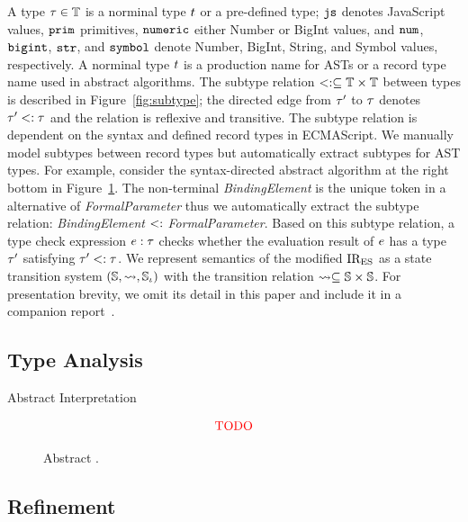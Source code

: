 A type $\tau \in \mathbb{T}$ is a norminal type $t$ or a pre-defined type;
$\texttt{js}$ denotes JavaScript values, $\texttt{prim}$ primitives, $\texttt{numeric}$ either Number
or BigInt values, and $\texttt{num}$, $\texttt{bigint}$, $\texttt{str}$, and $\texttt{symbol}$ denote Number,
BigInt, String, and Symbol values, respectively.  A norminal type $t$ is a
production name for ASTs or a record type name used in abstract algorithms.  The
subtype relation $<: \subseteq \mathbb{T} \times \mathbb{T}$ between types is
described in Figure~\ref{fig:subtype}; the directed edge from $\tau'$ to $\tau$
denotes $\tau' <: \tau$ and the relation is reflexive and transitive.  The
subtype relation is dependent on the syntax and defined record types in
ECMAScript.  We manually model subtypes between record types but automatically
extract subtypes for AST types.  For example, consider the syntax-directed
abstract algorithm at the right bottom in Figure~\ref{fig:example}.  The
non-terminal \textit{BindingElement} is the unique token in a alternative of
\textit{FormalParameter} thus we automatically extract the subtype relation:
\textit{BindingElement} $<:$ \textit{FormalParameter}.  Based on this
subtype relation, a type check expression $e: \tau$ checks whether the
evaluation result of $e$ has a type $\tau'$ satisfying $\tau' <: \tau$.
We represent semantics of the modified ${\text{IR}_\text{ES}}$ as a state transition system
$(\mathbb{S}, \leadsto, {\mathbb{S}}_\iota)$ with the transition relation $\leadsto \subseteq
\mathbb{S} \times \mathbb{S}$.  For presentation brevity, we omit its detail in this
paper and include it in a companion report~.
% 
% 
% 


\subsection{Type Analysis}\label{sec:analysis}

Abstract Interpretation~\cite{ai1977, ai1992}

\begin{figure}[t]
  \centering
  \[
    \text{{\color{red}{TODO}}}
  \]
  \vspace*{-1em}
  \caption{Abstract .}
  \label{fig:example}
\end{figure}



\subsection{Refinement}\label{sec:refine}
